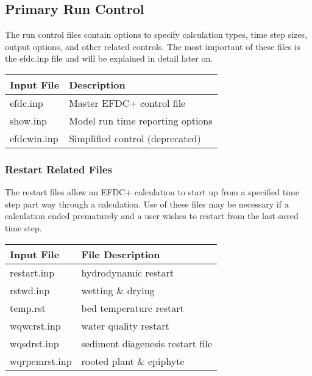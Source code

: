 \documentclass[letterpaper,10pt,english]{sphinxmanual}
\begin{document}
\noindent{}


\subsection{Primary Run Control}
\label{\detokenize{inputfiles/runcontrol/index:primary-run-control}}\label{\detokenize{inputfiles/runcontrol/index:runcontrol}}\label{\detokenize{inputfiles/runcontrol/index::doc}}
The run control files contain options to specify calculation types, time step sizes, output options, and other related controls.  The most important of these files is the efdc.inp file and will be explained in detail later on.


\begin{savenotes}\sphinxattablestart
\centering
\begin{tabulary}{\linewidth}[t]{|T|T|}
\hline
\sphinxstyletheadfamily 
Input File
&\sphinxstyletheadfamily 
Description
\\
\hline
efdc.inp
&
Master EFDC+ control file
\\
\hline
show.inp
&
Model run time reporting options
\\
\hline
efdcwin.inp
&
Simplified control (deprecated)
\\
\hline
\end{tabulary}
\par
\sphinxattableend\end{savenotes}


\subsubsection{Restart  Related Files}
\label{\detokenize{inputfiles/runcontrol/index:restart-related-files}}
The restart files allow an EFDC+ calculation to start up from a specified time step part way through a calculation.  Use of these files may be necessary if a calculation ended prematurely and a user wishes to restart from the last saved time step.


\begin{savenotes}\sphinxattablestart
\centering
\begin{tabulary}{\linewidth}[t]{|T|T|}
\hline
\sphinxstyletheadfamily 
Input File
&\sphinxstyletheadfamily 
File Description
\\
\hline
restart.inp
&
hydrodynamic restart
\\
\hline
rstwd.inp
&
wetting  \& drying
\\
\hline
temp.rst
&
bed temperature restart
\\
\hline
wqwcrst.inp
&
water quality restart
\\
\hline
wqsdrst.inp
&
sediment diagenesis restart file
\\
\hline
wqrpemrst.inp
&
rooted plant \& epiphyte
\\
\hline
\end{tabulary}
\par
\sphinxattableend\end{savenotes}
\end{document}
